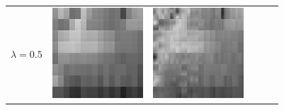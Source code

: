 \documentclass[11pt,a4paper,openright,oneside]{book}
\numberwithin{equation}{section}
\begin{document}
{\begin{figure}[h]
\begin{adjustwidth}{-3cm}{-3cm}
\begin{tabular}{>{\centering\arraybackslash}m{1.5cm} m{2.5cm} m{2.5cm} m{2.5cm} m{2.5cm} m{2.5cm}}
        $\lambda = 0.5$ &
        \includegraphics[width=\linewidth]{media/tnale/AAAfruits-comp1-ale-0.5.png} &
        \includegraphics[width=\linewidth]{media/tnale/AAAfruits-comp2-ale-0.5.png} &

\end{tabular}
\end{adjustwidth}
\end{figure}}
\end{document}
